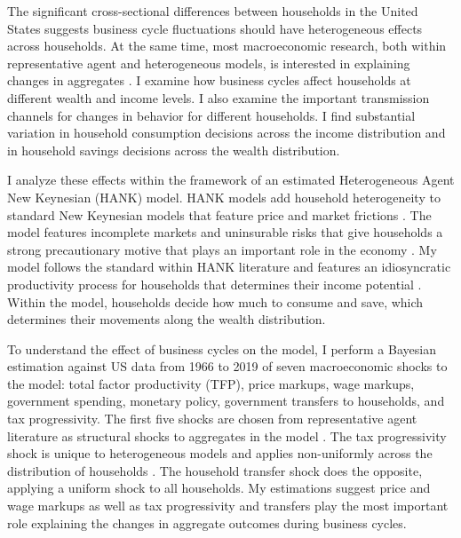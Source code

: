 The significant cross-sectional differences between households in the United States suggests business cycle fluctuations should have heterogeneous effects across households. At the same time, most macroeconomic research, both within representative agent and heterogeneous models, is interested in explaining changes in aggregates \autocites{smets2007shocks}{krusell1998income}{kaplan2018monetary}{auclert2019monetary}{mckay2016power}. I examine how business cycles affect households at different wealth and income levels. I also examine the important transmission channels for changes in behavior for different households. I find substantial variation in household consumption decisions across the income distribution and in household savings decisions across the wealth distribution.

I analyze these effects within the framework of an estimated Heterogeneous Agent New Keynesian (HANK) model. HANK models add household heterogeneity to standard New Keynesian models that feature price and market frictions \autocite{kaplan2018monetary}. The model features incomplete markets and uninsurable risks that give households a strong precautionary motive that plays an important role in the economy \autocites{mckay2016power}{bayer2019precautionary}. My model follows the standard within HANK literature and features an idiosyncratic productivity process for households that determines their income potential \autocites{kaplan2018monetary}{mckay2016power}. Within the model, households decide how much to consume and save, which determines their movements along the wealth distribution.

To understand the effect of business cycles on the model, I perform a Bayesian estimation against US data from 1966 to 2019 of seven macroeconomic shocks to the model: total factor productivity (TFP), price markups, wage markups, government spending, monetary policy, government transfers to households, and tax progressivity. The first five shocks are chosen from representative agent literature as structural shocks to aggregates in the model \autocite{smets2007shocks}. The tax progressivity shock is unique to heterogeneous models and applies non-uniformly across the distribution of households \autocite{bayer2024shocks}. The household transfer shock does the opposite, applying a uniform shock to all households. My estimations suggest price and wage markups  as well as tax progressivity and transfers play the most important role explaining the changes in aggregate outcomes during business cycles.

